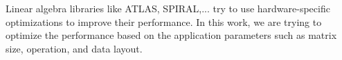 Linear algebra libraries like ATLAS, SPIRAL,... try to use hardware-specific optimizations to improve their performance. In this work, we are trying to optimize the performance based on the application parameters such as matrix size, operation, and data layout.   




\vspace{\baselineskip}
